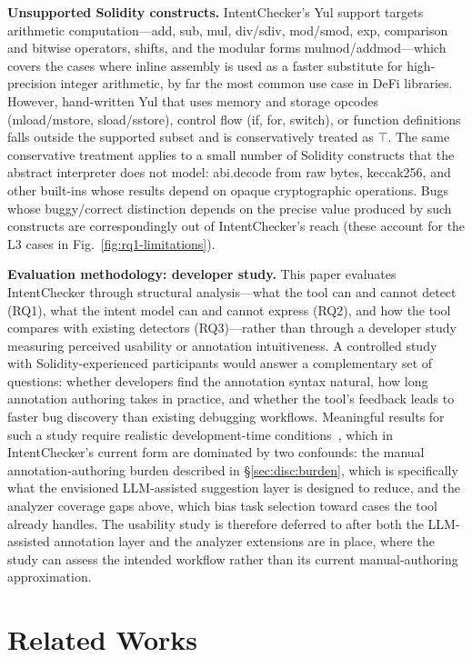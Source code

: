 \documentclass[pdflatex,sn-basic]{sn-jnl}%
\theoremstyle{thmstyleone}%
\theoremstyle{thmstyletwo}%
\theoremstyle{thmstylethree}%
\begin{document}
\smallskip
\noindent\textbf{Unsupported Solidity constructs.}
IntentChecker's Yul support targets arithmetic computation---add, sub, mul, div/sdiv, mod/smod, exp, comparison and bitwise operators, shifts, and the modular forms mulmod/addmod---which covers the cases where inline assembly is used as a faster substitute for high-precision integer arithmetic, by far the most common use case in DeFi libraries.
However, hand-written Yul that uses memory and storage opcodes (mload/mstore, sload/sstore), control flow (if, for, switch), or function definitions falls outside the supported subset and is conservatively treated as $\top$.
The same conservative treatment applies to a small number of Solidity constructs that the abstract interpreter does not model: abi.decode from raw bytes, keccak256, and other built-ins whose results depend on opaque cryptographic operations.
Bugs whose buggy/correct distinction depends on the precise value produced by such constructs are correspondingly out of IntentChecker's reach (these account for the L3 cases in Fig.~\ref{fig:rq1-limitations}).

\smallskip
\noindent\textbf{Evaluation methodology: developer study.}
This paper evaluates IntentChecker through structural analysis---what the tool can and cannot detect (RQ1), what the intent model can and cannot express (RQ2), and how the tool compares with existing detectors (RQ3)---rather than through a developer study measuring perceived usability or annotation intuitiveness.
A controlled study with Solidity-experienced participants would answer a complementary set of questions: whether developers find the annotation syntax natural, how long annotation authoring takes in practice, and whether the tool's feedback leads to faster bug discovery than existing debugging workflows.
Meaningful results for such a study require realistic development-time conditions~\citep{defisecurity}, which in IntentChecker's current form are dominated by two confounds: the manual annotation-authoring burden described in §\ref{sec:disc:burden}, which is specifically what the envisioned LLM-assisted suggestion layer is designed to reduce, and the analyzer coverage gaps above, which bias task selection toward cases the tool already handles.
The usability study is therefore deferred to after both the LLM-assisted annotation layer and the analyzer extensions are in place, where the study can assess the intended workflow rather than its current manual-authoring approximation.

\section{Related Works}\label{sec:related}
\end{document}
